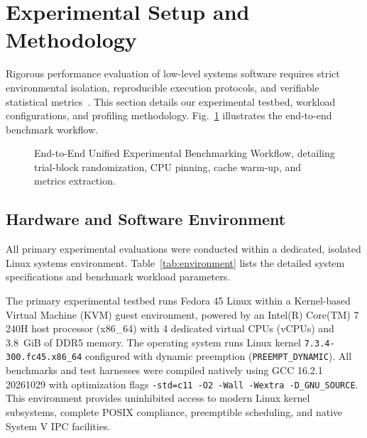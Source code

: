 \section{Experimental Setup and Methodology}
\label{sec:methodology}



Rigorous performance evaluation of low-level systems software requires strict environmental isolation, reproducible execution protocols, and verifiable statistical metrics~\cite{gregg2020systems}. This section details our experimental testbed, workload configurations, and profiling methodology. Fig.~\ref{fig:benchmark_workflow} illustrates the end-to-end benchmark workflow.

\begin{figure}[!t]
\centering

\caption{End-to-End Unified Experimental Benchmarking Workflow, detailing trial-block randomization, CPU pinning, cache warm-up, and metrics extraction.}
\label{fig:benchmark_workflow}
\end{figure}

\subsection{Hardware and Software Environment}
All primary experimental evaluations were conducted within a dedicated, isolated Linux systems environment. Table~\ref{tab:environment} lists the detailed system specifications and benchmark workload parameters.

The primary experimental testbed runs Fedora 45 Linux within a Kernel-based Virtual Machine (KVM) guest environment, powered by an Intel(R) Core(TM) 7 240H host processor (x86\_64) with 4 dedicated virtual CPUs (vCPUs) and 3.8~GiB of DDR5 memory. The operating system runs Linux kernel \texttt{7.3.4-300.fc45.x86\_64} configured with dynamic preemption (\texttt{PREEMPT\_DYNAMIC}). All benchmarks and test harnesses were compiled natively using GCC 16.2.1 20261029 with optimization flags \texttt{-std=c11 -O2 -Wall -Wextra -D\_GNU\_SOURCE}. This environment provides uninhibited access to modern Linux kernel subsystems, complete POSIX compliance, preemptible scheduling, and native System V IPC facilities.

